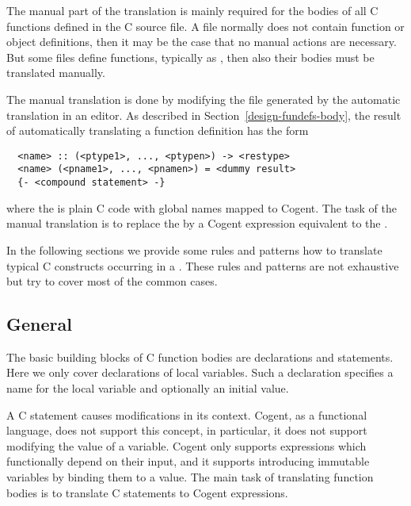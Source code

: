 The manual part of the translation is mainly required for the bodies of all C functions defined in the C source file.
A  file normally does not contain function or object definitions, then it may be the case that no manual actions 
are necessary. But some  files define functions, typically as , then also their bodies
must be translated manually.

The manual translation is done by modifying the  file generated by the automatic translation in an 
editor. As described in Section~\ref{design-fundefs-body}, the result of automatically translating a function
definition has the form
\begin{verbatim}
  <name> :: (<ptype1>, ..., <ptypen>) -> <restype>
  <name> (<pname1>, ..., <pnamen>) = <dummy result>
  {- <compound statement> -}
\end{verbatim}
where the  is plain C code with global names mapped to Cogent. The task of the manual
translation is to replace the  by a Cogent expression equivalent to the .

In the following sections we provide some rules and patterns how to translate typical C constructs occurring in a
. These rules and patterns are not exhaustive but try to cover most of the common cases.

\subsection{General}
\label{app-transfunction-general}

The basic building blocks of C function bodies are declarations and statements. Here we only cover declarations of 
local variables. Such a declaration specifies a name for the local variable and optionally an initial value.

A C statement causes modifications in its context. Cogent, as a functional language, does not support this concept,
in particular, it does not support modifying the value of a variable. Cogent only supports expressions which functionally
depend on their input, and it supports introducing immutable variables by binding them to a value. 
The main task of translating function bodies is to translate C statements to Cogent expressions.


